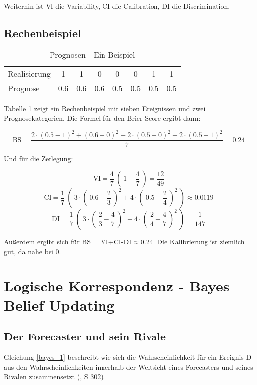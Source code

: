 Weiterhin ist VI die Variability, CI die Calibration, DI die Discrimination.

\subsection{Rechenbeispiel}

\begin{table}
\centering
\caption{Prognosen - Ein Beispiel}
\label{progs}
\begin{tabular}{ l|c c c | c c c c| }
Realisierung & 1 & 1 & 0 & 0 & 0 & 1 & 1 \\
Prognose & 0.6 & 0.6 & 0.6 & 0.5 & 0.5 & 0.5 & 0.5

\end{tabular}
\end{table}

Tabelle \ref{progs} zeigt ein Rechenbeispiel mit sieben Ereignissen und zwei
Prognosekategorien. Die Formel für den Brier Score ergibt dann:

\begin{equation*}
\textrm{BS} = \frac{2 \cdot (0.6-1)^2 + (0.6-0)^2 + 2 \cdot (0.5-0)^2 + 2 \cdot (0.5-1)^2}{7} = 0.24
\end{equation*}

Und für die Zerlegung:

\begin{equation*}
\textrm{VI} = \frac{4}{7} ~(~1-\frac{4}{7}~)=\frac{12}{49} 
\end{equation*}
\begin{equation*}
\textrm{CI} = \frac{1}{7}~(~3 \cdot (~0.6 - \frac{2}{3}~)^2 + 4 \cdot (~0.5 - \frac{2}{4}~)^2~) \approx 0.0019 
\end{equation*}
\begin{equation*}
\textrm{DI} = \frac{1}{7} ~(~ 3 \cdot (~\frac{2}{3}-\frac{4}{7}~)^2 + 4 \cdot (~\frac{2}{4} - \frac{4}{7}~)^2 ~) = \frac{1}{147}
\end{equation*}

Außerdem ergibt sich für BS  = VI+CI-DI$\approx 0.24$. Die Kalibrierung ist ziemlich gut, da nahe bei 0.

\section{Logische Korrespondenz - Bayes Belief Updating} \label{Anhang_Bayes}

\subsection{Der Forecaster und sein Rivale}
Gleichung \ref{bayes_1} beschreibt wie sich die Wahrscheinlichkeit für ein Ereignis D aus den Wahrscheinlichkeiten
innerhalb der Weltsicht eines Forecasters und seines Rivalen zusammensetzt (\cite{Tetlock}, S 302).

